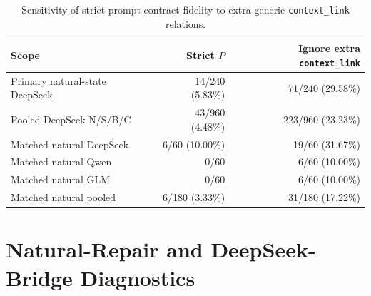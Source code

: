 \documentclass[11pt]{article}
\newcommand{\Pstrict}{P}
\begin{document}
\begin{table}[h]
\centering
\caption{Sensitivity of strict prompt-contract fidelity to extra generic \texttt{context\_link} relations.}
\label{tab:ctx_sensitivity}
\small
\begin{tabular}{@{}lrr@{}}
\toprule
Scope & Strict \(\Pstrict\) & Ignore extra \texttt{context\_link} \\
\midrule
Primary natural-state DeepSeek & 14/240 (5.83\%) & 71/240 (29.58\%) \\
Pooled DeepSeek N/S/B/C & 43/960 (4.48\%) & 223/960 (23.23\%) \\
Matched natural DeepSeek & 6/60 (10.00\%) & 19/60 (31.67\%) \\
Matched natural Qwen & 0/60 & 6/60 (10.00\%) \\
Matched natural GLM & 0/60 & 6/60 (10.00\%) \\
Matched natural pooled & 6/180 (3.33\%) & 31/180 (17.22\%) \\
\bottomrule
\end{tabular}
\end{table}

\section{Natural-Repair and DeepSeek-Bridge Diagnostics}
\label{app:new_results}
\end{document}
